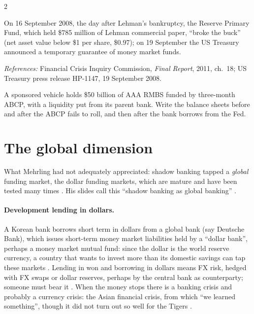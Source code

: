 \begin{paracol}{2}
\begin{history}
On 16 September 2008, the day after Lehman's bankruptcy, the Reserve Primary Fund, which held \$785 million of Lehman commercial paper, ``broke the buck'' (net asset
value below \$1 per share, \$0.97); on 19 September the US Treasury announced a temporary guarantee of money market funds.\par
\emph{References:} Financial Crisis Inquiry Commission, \emph{Final Report}, 2011, ch.~18; US Treasury press release HP-1147, 19 September 2008.
\end{history}

\begin{exercise}
A sponsored vehicle holds \$50 billion of AAA RMBS funded by three-month ABCP, with a liquidity put from its parent bank. Write the balance sheets before and after the
ABCP fails to roll, and then after the bank borrows from the Fed.
\end{exercise}

\section{The global dimension}\label{sec:cbs-global}

What Mehrling had not adequately appreciated: shadow banking tapped a \emph{global} funding market, the dollar funding markets, which are mature and have been
tested many times . His slides call this ``shadow banking as global banking'' .

\paragraph{Development lending in dollars.} A Korean bank borrows short term in dollars from a global bank (say Deutsche Bank), which issues short-term money market
liabilities held by a ``dollar bank'', perhaps a money market mutual fund: since the dollar is the world reserve currency, a country that wants to invest more than its
domestic savings can tap these markets . Lending in won and borrowing in dollars means
FX risk, hedged with FX swaps or dollar reserves, perhaps by the central bank as counterparty; someone must bear it . When
the money stops there is a banking crisis and probably a currency crisis: the Asian financial crisis, from which ``we learned something'', though it did not turn out
so well for the Tigers .


\end{paracol}
